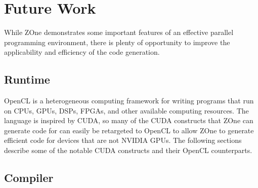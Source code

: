 \section{Future Work}

While ZOne demonstrates some important features of an effective parallel
programming environment, there is plenty of opportunity to improve the
applicability and efficiency of the code generation.

\subsection{Runtime}

OpenCL is a heterogeneous computing framework for writing programs that run
on CPUs, GPUs, DSPs, FPGAs, and other available computing resources. The
language is inspired by CUDA, so many of the CUDA constructs that ZOne can
generate code for can easily be retargeted to OpenCL to allow ZOne to generate
efficient code for devices that are not NVIDIA GPUs. The following sections
describe some of the notable CUDA constructs and their OpenCL counterparts.

\subsection{Compiler}

